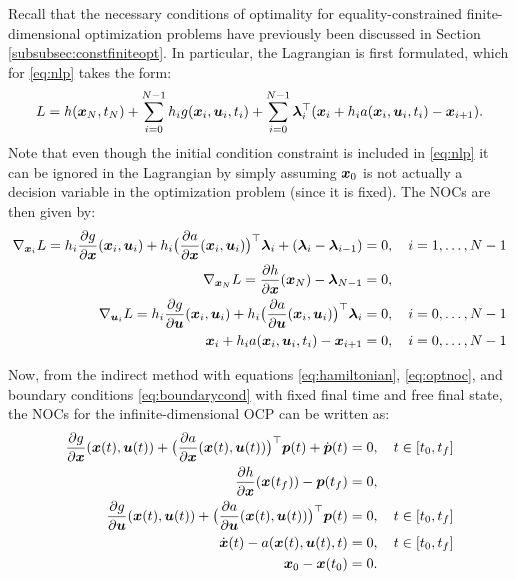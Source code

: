 Recall that the necessary conditions of optimality for equality-constrained finite-dimensional optimization problems have previously been discussed in Section \ref{subsubsec:constfiniteopt}. In particular, the Lagrangian is first formulated, which for \eqref{eq:nlp} takes the form:
\begin{equation*}
L = h(\bm{x}_N,t_N) + \sum_{i=0}^{N-1} h_i g(\bm{x}_i,\bm{u}_i,t_i) + \sum_{i=0}^{N-1} \bm{\lambda}_i^\top (\bm{x}_{i} + h_ia(\bm{x}_i, \bm{u}_i, t_i) - \bm{x}_{i+1}).
\end{equation*}
Note that even though the initial condition constraint is included in \eqref{eq:nlp} it can be ignored in the Lagrangian by simply assuming $\bm{x}_0$ is not actually a decision variable in the optimization problem (since it is fixed).
The NOCs are then given by:
\begin{equation} \label{eq:dirnoc}
\begin{split}
\nabla_{\bm{x}_i} L = h_i \frac{\partial g}{\partial \bm{x}}(\bm{x}_i, \bm{u}_i) + h_i\big(\frac{\partial a}{\partial \bm{x}}(\bm{x}_i, \bm{u}_i)\big)^\top  \bm{\lambda}_i + (\bm{\lambda}_i - \bm{\lambda}_{i-1}) &= 0, \quad i = 1,\dots,N-1 \\
\nabla_{\bm{x}_N} L = \frac{\partial h}{\partial \bm{x}}(\bm{x}_N) - \bm{\lambda}_{N-1} &= 0, \\
\nabla_{\bm{u}_i} L = h_i \frac{\partial g}{\partial \bm{u}}(\bm{x}_i, \bm{u}_i) + h_i\big(\frac{\partial a}{\partial \bm{u}}(\bm{x}_i, \bm{u}_i)\big)^\top  \bm{\lambda}_i &= 0, \quad i = 0, \dots, N-1\\
\bm{x}_{i} + h_ia(\bm{x}_i, \bm{u}_i, t_i) - \bm{x}_{i+1} &= 0, \quad i = 0,\dots,N-1\\
\end{split}
\end{equation}

Now, from the indirect method with equations \eqref{eq:hamiltonian}, \eqref{eq:optnoc}, and boundary conditions \eqref{eq:boundarycond} with fixed final time and free final state, the NOCs for the infinite-dimensional OCP can be written as:
\begin{equation} \label{eq:indinoc}
\begin{split}
\frac{\partial g}{\partial \bm{x}}(\bm{x}(t), \bm{u}(t)) + \big(\frac{\partial a}{\partial \bm{x}}(\bm{x}(t), \bm{u}(t))\big)^\top  \bm{p}(t) + \dot{\bm{p}}(t) &= 0, \quad t \in [t_0,t_f] \\
\frac{\partial h}{\partial \bm{x}}(\bm{x}(t_f)) - \bm{p}(t_f) &= 0, \\
\frac{\partial g}{\partial \bm{u}}(\bm{x}(t), \bm{u}(t)) + \big(\frac{\partial a}{\partial \bm{u}}(\bm{x}(t), \bm{u}(t))\big)^\top  \bm{p}(t) &= 0, \quad t \in [t_0, t_f]\\
\dot{\bm{x}}(t) - a(\bm{x}(t), \bm{u}(t), t) &= 0, \quad t\in[t_0,t_f]\\
\bm{x}_0 - \bm{x}(t_0) &= 0.
\end{split}
\end{equation}

